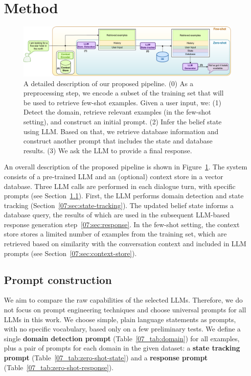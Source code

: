 \section{Method}
\label{07:sec:method}
\begin{figure}[t]
    \centering
    \includegraphics[width=\textwidth]{images/llm-chatbot-v3.pdf}
    \caption{A detailed description of our proposed pipeline. (0) As a preprocessing step, we encode a subset of the training set that will be used to retrieve few-shot examples.
    Given a user input, we: (1) Detect the domain, retrieve relevant examples (in the few-shot setting), and construct an initial prompt. (2) Infer the belief state using LLM. Based on that, we retrieve database information and construct another prompt that includes the state and database results. (3) We ask the LLM to provide a final response.}
    \label{07:fig:overview_low_level}
\end{figure}
An overall description of the proposed pipeline is shown in Figure~\ref{07:fig:overview_low_level}.
The system consists of a pre-trained LLM and an (optional) context store in a vector database.
Three LLM calls are performed in each dialogue turn, with specific prompts (see Section~\ref{07:sec:prompts}).
First, the LLM performs domain detection and state tracking (Section~\ref{07:sec:state-tracking}).
The updated belief state informs a database query, the results of which are used in the subsequent LLM-based response generation step~\ref{07:sec:response}.
In the few-shot setting, the context store stores a limited number of examples from the training set, which are retrieved based on similarity with the conversation context and included in LLM prompts (see Section~\ref{07:sec:context-store}).


\subsection{Prompt construction}
\label{07:sec:prompts}
We aim to compare the raw capabilities of the selected LLMs.
Therefore, we do not focus on prompt engineering techniques and choose universal prompts for all LLMs in this work.
We choose simple, plain language statements as prompts, with no specific vocabulary, based only on a few preliminary tests.
We define a single \textbf{domain detection prompt} (Table~\ref{07_tab:domain}) for all examples, plus a pair of prompts for each domain in the given dataset: a \textbf{state tracking prompt} (Table~\ref{07_tab:zero-shot-state}) and a \textbf{response prompt} (Table~\ref{07_tab:zero-shot-response}).

